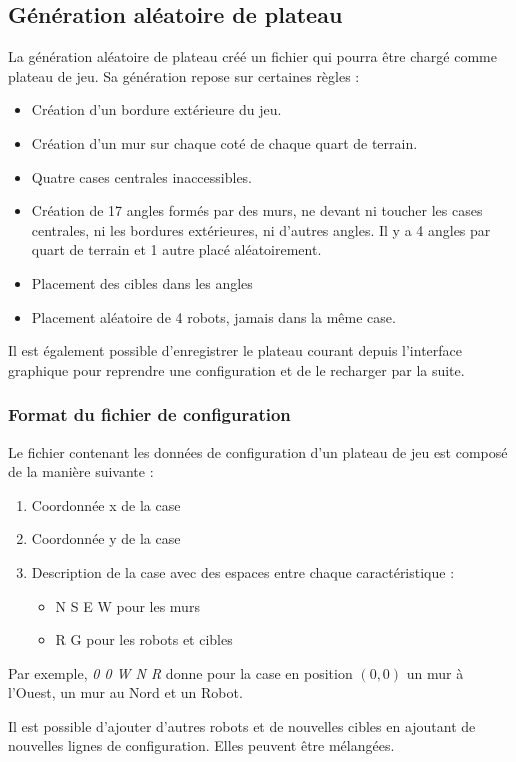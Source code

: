\documentclass[a4paper]{article} %
\begin{document}
	\subsection{Génération aléatoire de plateau}
La génération aléatoire de plateau créé un fichier qui pourra être chargé comme plateau de jeu. Sa génération repose sur certaines règles :
\begin{itemize}
\item Création d'un bordure extérieure du jeu.
\item Création d'un mur sur chaque coté de chaque quart de terrain.
\item Quatre cases centrales inaccessibles.
\item Création de 17 angles formés par des murs, ne devant ni toucher les cases centrales, ni les bordures extérieures, ni d'autres angles. Il y a 4 angles par quart de terrain et 1 autre placé aléatoirement.
\item Placement des cibles dans les angles
\item Placement aléatoire de 4 robots, jamais dans la même case.
\end{itemize}

Il est également possible d'enregistrer le plateau courant depuis l'interface graphique pour reprendre une configuration et de le recharger par la suite.

		\subsubsection{Format du fichier de configuration}\label{structFichier}
Le fichier contenant les données de configuration d'un plateau de jeu est composé de la manière suivante :
\begin{enumerate}
\item Coordonnée x de la case
\item Coordonnée y de la case
\item Description de la case avec des espaces entre chaque caractéristique :
\begin{itemize}
\item N S E W pour les murs
\item R G pour les robots et cibles
\end{itemize}
\end{enumerate}
Par exemple, \textsl{0 0 W N R} donne pour la case en position $(0,0)$ un mur à l'Ouest, un mur au Nord et un Robot.

Il est possible d'ajouter d'autres robots et de nouvelles cibles en ajoutant de nouvelles lignes de configuration. Elles peuvent être mélangées.
\end{document}
